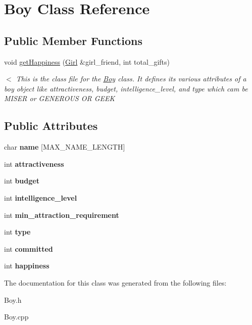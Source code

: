 \hypertarget{class_boy}{}\section{Boy Class Reference}
\label{class_boy}
\subsection*{Public Member Functions}
\begin{DoxyCompactItemize}
\item 
\mbox{\label{class_boy_a45d40d86f500ac876afd0af425a6acf5}} 
void \hyperlink{class_boy_a45d40d86f500ac876afd0af425a6acf5}{get\+Happiness} (\hyperlink{class_girl}{Girl} \&girl\+\_\+friend, int total\+\_\+gifts)
\begin{DoxyCompactList}\small\item\em $<$ This is the class file for the \hyperlink{class_boy}{Boy} class. It defines it\textquotesingle{}s various attributes of a boy object like attractiveness, budget, intelligence\+\_\+level, and type which cam be M\+I\+S\+ER or G\+E\+N\+E\+R\+O\+US OR G\+E\+EK \end{DoxyCompactList}\end{DoxyCompactItemize}
\subsection*{Public Attributes}
\begin{DoxyCompactItemize}
\item 
\mbox{\label{class_boy_a3ceaefba33434bcf8ec3c88fc4622af8}} 
char {\bfseries name} \mbox{[}M\+A\+X\+\_\+\+N\+A\+M\+E\+\_\+\+L\+E\+N\+G\+TH\mbox{]}
\item 
\mbox{\label{class_boy_a679e59279116986aaae135d8a524bc46}} 
int {\bfseries attractiveness}
\item 
\mbox{\label{class_boy_a3b755250e77f892967872c7eb4c26685}} 
int {\bfseries budget}
\item 
\mbox{\label{class_boy_a2974e9a9600a7d88256b159b868b80c0}} 
int {\bfseries intelligence\+\_\+level}
\item 
\mbox{\label{class_boy_a3b85e00dc9b5e1b67a6954a1230656c4}} 
int {\bfseries min\+\_\+attraction\+\_\+requirement}
\item 
\mbox{\label{class_boy_a1b907f52b73e8355ce0dd02db65afa4f}} 
int {\bfseries type}
\item 
\mbox{\label{class_boy_ab92b452f9cf9d97fc0c0f8aa6139da46}} 
int {\bfseries committed}
\item 
\mbox{\label{class_boy_adaf15f15972678dbd77e8b8b319d5767}} 
int {\bfseries happiness}
\end{DoxyCompactItemize}


The documentation for this class was generated from the following files\+:\begin{DoxyCompactItemize}
\item 
Boy.\+h\item 
Boy.\+cpp\end{DoxyCompactItemize}
